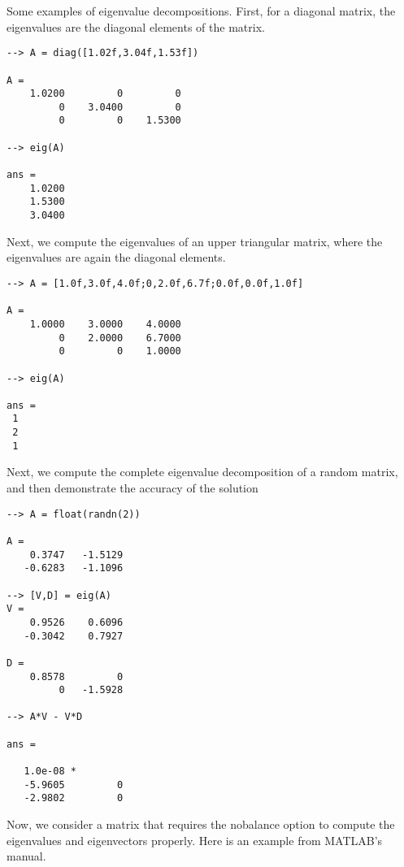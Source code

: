 Some examples of eigenvalue decompositions.  First, for a diagonal
matrix, the eigenvalues are the diagonal elements of the matrix.
\begin{verbatim}
--> A = diag([1.02f,3.04f,1.53f])

A = 
    1.0200         0         0 
         0    3.0400         0 
         0         0    1.5300 

--> eig(A)

ans = 
    1.0200 
    1.5300 
    3.0400 
\end{verbatim}
Next, we compute the eigenvalues of an upper triangular matrix, 
where the eigenvalues are again the diagonal elements.
\begin{verbatim}
--> A = [1.0f,3.0f,4.0f;0,2.0f,6.7f;0.0f,0.0f,1.0f]

A = 
    1.0000    3.0000    4.0000 
         0    2.0000    6.7000 
         0         0    1.0000 

--> eig(A)

ans = 
 1 
 2 
 1 
\end{verbatim}
Next, we compute the complete eigenvalue decomposition of
a random matrix, and then demonstrate the accuracy of the solution
\begin{verbatim}
--> A = float(randn(2))

A = 
    0.3747   -1.5129 
   -0.6283   -1.1096 

--> [V,D] = eig(A)
V = 
    0.9526    0.6096 
   -0.3042    0.7927 

D = 
    0.8578         0 
         0   -1.5928 

--> A*V - V*D

ans = 

   1.0e-08 * 
   -5.9605         0 
   -2.9802         0 
\end{verbatim}
Now, we consider a matrix that requires the nobalance option
to compute the eigenvalues and eigenvectors properly.  Here is
an example from MATLAB's manual.
